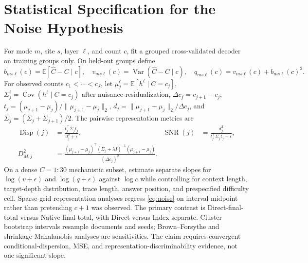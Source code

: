 \documentclass[11pt]{article}
\newcommand{\E}{\mathbb{E}}
\newcommand{\Var}{\operatorname{Var}}
\newcommand{\Cov}{\operatorname{Cov}}
\begin{document}
\section{Statistical Specification for the Noise Hypothesis}
\label{app:noise}

For mode $m$, site $s$, layer $\ell$, and count $c$, fit a grouped cross-validated decoder on training groups only. On held-out groups define
\begin{equation}
 b_{ms\ell}(c)=\E[\widehat C-C\mid c],\quad
 v_{ms\ell}(c)=\Var(\widehat C-C\mid c),\quad
 q_{ms\ell}(c)=v_{ms\ell}(c)+b_{ms\ell}(c)^2.
\end{equation}
For observed counts $c_1<\cdots<c_J$, let $\mu_j^\ell=\E[h^\ell\mid C=c_j]$, $\Sigma_j^\ell=\Cov(h^\ell\mid C=c_j)$ after nuisance residualization, $\Delta c_j=c_{j+1}-c_j$, $t_j=(\mu_{j+1}-\mu_j)/\|\mu_{j+1}-\mu_j\|_2$, $d_j=\|\mu_{j+1}-\mu_j\|_2/\Delta c_j$, and $\bar\Sigma_j=(\Sigma_j+\Sigma_{j+1})/2$. The pairwise representation metrics are
\begin{align}
\operatorname{Disp}(j)&=\frac{t_j^\top\bar\Sigma_jt_j}{d_j^2+\epsilon},
& \operatorname{SNR}(j)&=\frac{d_j^2}{t_j^\top\bar\Sigma_jt_j+\epsilon},\\
D^2_{M,j}&=\frac{(\mu_{j+1}-\mu_j)^\top(\bar\Sigma_j+\lambda I)^{-1}(\mu_{j+1}-\mu_j)}{(\Delta c_j)^2}.
\label{eq:noise}
\end{align}
On a dense $C=1{:}30$ mechanistic subset, estimate separate slopes for $\log(v+\epsilon)$ and $\log(q+\epsilon)$ against $\log c$ while controlling for context length, target-depth distribution, trace length, answer position, and prespecified difficulty cell. Sparse-grid representation analyses regress \cref{eq:noise} on interval midpoint rather than pretending $c+1$ was observed. The primary contrast is Direct-final-total versus Native-final-total, with Direct versus Index separate. Cluster bootstrap intervals resample documents and seeds; Brown--Forsythe and shrinkage-Mahalanobis analyses are sensitivities. The claim requires convergent conditional-dispersion, MSE, and representation-discriminability evidence, not one significant slope.
\end{document}
